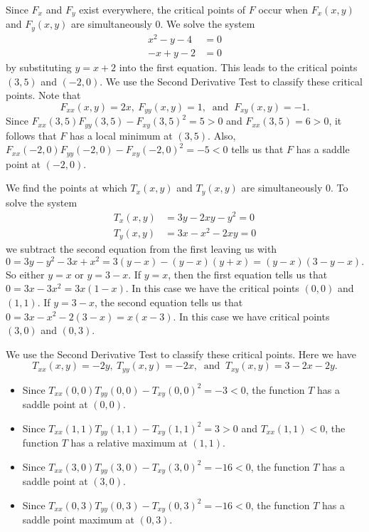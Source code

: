 \begin{exercises}
\begin{exerciseSolution}
  \item Since $F_x$ and $F_y$ exist everywhere, the critical points of $F$ occur when $F_x(x,y)$ and $F_y(x,y)$ are simultaneously 0. We solve the system
\begin{align*}
x^2-y-4 &= 0 \\
-x + y - 2 &= 0
\end{align*}
by substituting $y = x+2$ into the first equation. This leads to the critical points $(3,5)$ and $(-2,0)$. We use the Second Derivative Test to classify these critical points. Note that 
\[F_{xx}(x,y) = 2x, \ F_{yy}(x,y) = 1, \ \text{ and } \ F_{xy}(x,y) = -1.\]
Since $F_{xx}(3,5)F_{yy}(3,5) - F_{xy}(3,5)^2 = 5 > 0$ and $F_{xx}(3,5) = 6 > 0$, it follows that $F$ has a local minimum at $(3,5)$. Also, $F_{xx}(-2,0)F_{yy}(-2,0) - F_{xy}(-2,0)^2 = -5 <  0$ tells us that $F$ has a saddle point at $(-2,0)$. 

  \item We find the points at which $T_x(x,y)$ and $T_y(x,y)$ are simultaneously 0. To solve the system
\begin{align*}
T_x(x,y) &= 3y-2xy-y^2 = 0 \\
T_y(x,y) &= 3x-x^2-2xy = 0 
\end{align*}
we subtract the second equation from the first leaving us with 
\[0 = 3y-y^2-3x+x^2 = 3(y-x) - (y-x)(y+x) = (y-x)(3-y-x).\]
So either $y=x$ or $y=3-x$. If $y=x$, then the first equation tells us that $0 = 3x-3x^2 = 3x(1-x)$. In this case we have the critical points $(0,0)$ and $(1,1)$. If $y=3-x$, the second equation tells us that $0 = 3x-x^2-2(3-x) = x(x-3)$. In this case we have critical points $(3,0)$ and $(0,3)$.

We use the Second Derivative Test to classify these critical points. Here we have 
\[T_{xx}(x,y) = -2y, \ T_{yy}(x,y) = -2x, \ \text{ and } \ T_{xy}(x,y) = 3-2x-2y.\]

\begin{itemize}
\item Since $T_{xx}(0,0)T_{yy}(0,0) - T_{xy}(0,0)^2 = -3 < 0$, the function $T$ has a saddle point at $(0,0)$.
\item Since $T_{xx}(1,1)T_{yy}(1,1) - T_{xy}(1,1)^2 = 3 > 0$ and $T_{xx}(1,1) < 0$, the function $T$ has a relative maximum at $(1,1)$.
\item Since $T_{xx}(3,0)T_{yy}(3,0) - T_{xy}(3,0)^2 = -16 < 0$, the function $T$ has a saddle point at $(3,0)$.
\item Since $T_{xx}(0,3)T_{yy}(0,3) - T_{xy}(0,3)^2 = -16 < 0$, the function $T$ has a saddle point maximum at $(0,3)$.
\end{itemize}


\end{exerciseSolution}
\end{exercises}
